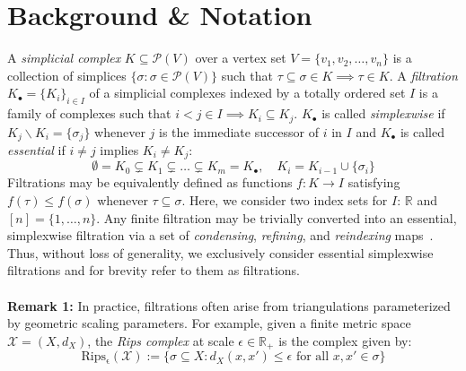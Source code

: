 \documentclass[10pt]{article}
\newtheorem{remark}{Remark}
\begin{document}
\section{Background \& Notation}\label{sec:background_notation}
A \emph{simplicial complex} $K \subseteq \mathcal{P}(V)$ over a vertex set $V = \{v_1, v_2, \dots, v_n \}$ is a collection of simplices $\{\sigma : \sigma \in \mathcal{P}(V) \}$ such that $\tau \subseteq \sigma \in K \implies \tau \in K$.
A \emph{filtration} $K_\bullet = \{K_i\}_{i\in I}$ of a simplicial complexes indexed by a totally ordered set $I$ is a family of complexes such that $i< j \in I \implies K_i \subseteq K_j$. $K_\bullet$ is called \emph{simplexwise} if $K_j \smallsetminus K_i = \{\sigma_j\}$ whenever $j$ is the immediate successor of $i$ in $I$ and $K_\bullet$ is called \emph{essential} if $i \neq j$ implies $K_i \neq K_j$:
\begin{equation}
	\emptyset = K_0 \subsetneq K_1 \subsetneq \dots \subsetneq K_m  = K_\bullet, \quad K_i  = K_{i-1} \cup \{\sigma_i\}
\end{equation} 
Filtrations may be equivalently defined as functions $f : K \to I$ satisfying $f(\tau) \leq f(\sigma)$ whenever $\tau \subseteq \sigma$. Here, we consider two index sets for $I$: $\mathbb{R}$ and $[n] = \{ 1, \dots, n\}$. 
Any finite filtration may be trivially converted into an essential, simplexwise filtration via a set of \emph{condensing}, \emph{refining}, and \emph{reindexing} maps~\cite{bauer2021ripser}. Thus, without loss of generality, we exclusively consider essential simplexwise filtrations and for brevity refer to them as filtrations.
\\
\\
\noindent
\textbf{Remark 1:}
\normalfont In practice, filtrations often arise from triangulations parameterized by geometric scaling parameters. 
For example, given a finite metric space $\mathcal{X} = (X, d_X)$, the \emph{Rips complex} at scale $\epsilon \in \mathbb{R}_{+}$ is the complex given by: 
\begin{equation}
	\mathrm{Rips_{\epsilon}}(\mathcal{X}) := \{ \sigma \subseteq X : d_X(x, x') \leq \epsilon \text{ for all } x, x' \in \sigma \} 
\end{equation}
\end{document}
